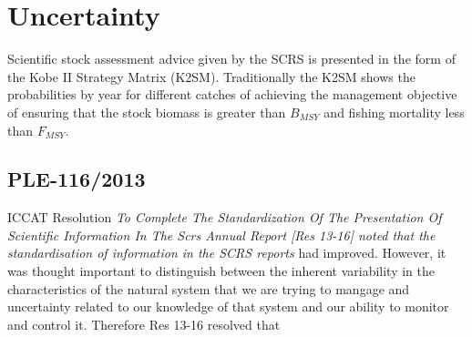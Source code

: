 \documentclass[a4paper,10pt]{article}
\begin{document}
\section*{Uncertainty}

Scientific stock assessment advice given by the SCRS is presented in the form of the Kobe II Strategy Matrix (K2SM). 
Traditionally the K2SM shows the probabilities by year for different catches of achieving the management objective of ensuring 
that the stock biomass is greater than $B_{MSY}$ and fishing mortality less than $F_{MSY}$. 

\subsection*{PLE-116/2013}

ICCAT Resolution \textit{To Complete The Standardization Of The Presentation Of Scientific Information In The Scrs Annual Report [Res 13-16]
noted that the standardisation of information in the SCRS reports} had improved. However, it was thought important to distinguish 
between the inherent variability in the characteristics of the natural system that we are trying to mangage and uncertainty related 
to our knowledge of that system and our ability to monitor and control it. Therefore Res 13-16 resolved that 
\end{document}
